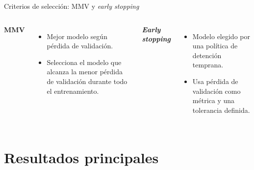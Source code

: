 \documentclass[aspectratio=169,11pt]{beamer}
\begin{document}
\begin{frame}{Criterios de selección: MMV y \textit{early stopping}}
\begin{columns}[T,totalwidth=\textwidth]
\textbf{MMV}
\begin{itemize}
  \item Mejor modelo según pérdida de validación.
  \item Selecciona el modelo que alcanza la menor pérdida de validación durante todo el entrenamiento.
\end{itemize}

\textbf{\textit{Early stopping}}
\begin{itemize}
  \item Modelo elegido por una política de detención temprana.
  \item Usa pérdida de validación como métrica y una tolerancia definida.
\end{itemize}
\end{columns}
\end{frame}

\section{Resultados principales}
\end{document}
